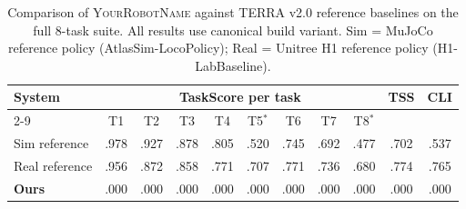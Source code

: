 \begin{table}[t]
  \centering
  \caption{%
    Comparison of \textsc{YourRobotName} against TERRA v2.0 reference baselines on the full 8-task suite.
    All results use canonical build variant.
    Sim = MuJoCo reference policy (AtlasSim-LocoPolicy);
    Real = Unitree H1 reference policy (H1-LabBaseline).
  }
  \label{tab:terra_comparison}
  \footnotesize
  \begin{tabular}{@{}lcccccccccc@{}}
    \toprule
    \multirow{2}{*}{\textbf{System}} &
    \multicolumn{8}{c}{\textbf{TaskScore per task}} &
    \multirow{2}{*}{\textbf{TSS}} &
    \multirow{2}{*}{\textbf{CLI}} \\
    \cmidrule(lr){2-9}
    & T1 & T2 & T3 & T4 & T5$^*$ & T6 & T7 & T8$^*$ & & \\
    \midrule
    Sim reference   & .978 & .927 & .878 & .805 & .520 & .745 & .692 & .477 & .702 & .537 \\
    Real reference  & .956 & .872 & .858 & .771 & .707 & .771 & .736 & .680 & .774 & .765 \\
    \textbf{Ours}   & .000 & .000 & .000 & .000 & .000 & .000 & .000 & .000 & .000 & .000 \\
    \bottomrule
  \end{tabular}
\end{table}
